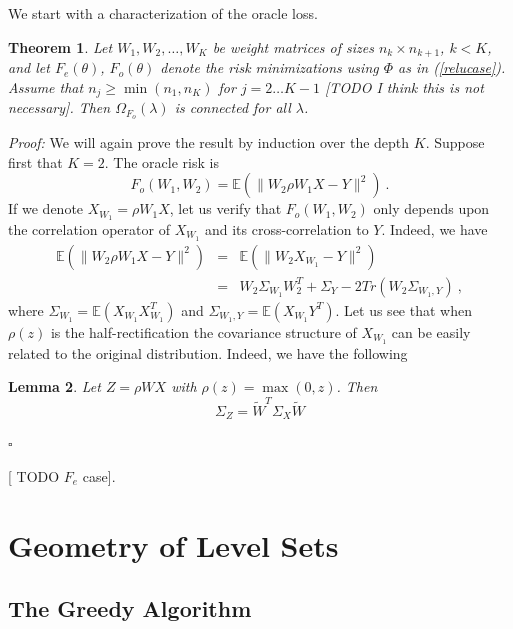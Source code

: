 \documentclass{article} %
\newcommand {\Fem} {F_{e}}
\newcommand {\Forr} {F_{o}}
\newcommand{\Exp}[1]{\mathbb{E}\left(#1 \right)}
\newtheorem{theorem}{Theorem}[section]
\newtheorem{lemma}[theorem]{Lemma}
\begin{document}
We start with a characterization of the oracle loss. 
\begin{theorem}
Let $W_1, W_2, \dots, W_K$ be weight matrices of sizes 
$n_k \times n_{k+1}$, $k < K$, and let $\Fem(\theta)$, $\Forr(\theta)$ 
denote the risk minimizations using $\Phi$ as in (\ref{relucase}).
Assume that $n_j \geq \min(n_1, n_K)$ for $j=2 \dots K-1$ [TODO I think this is not necessary].
Then $\Omega_{\Forr}(\lambda)$ is connected for all $\lambda$. 
\end{theorem}
{\it Proof:}
We will again prove the result by induction over the depth $K$. 
Suppose first that $K=2$. The oracle risk is 
$$\Forr( W_1, W_2) = \Exp{ \| W_2 \rho W_1 X - Y \|^2}~.$$
If we denote $X_{W_1} = \rho W_1 X$, let us verify that $\Forr(W_1, W_2)$ 
only depends upon the correlation operator of $X_{W_1}$ 
and its cross-correlation to $Y$. Indeed, we have
\begin{eqnarray*}
\Exp{ \| W_2 \rho W_1 X - Y \|^2} &=& \Exp{ \| W_2 X_{W_1} - Y \|^2} \\
&=& W_2 \Sigma_{W_1} W_2^T + \Sigma_Y - 2  Tr\left( W_2 \Sigma_{W_1,Y} \right)~,
\end{eqnarray*}
where $\Sigma_{W_1} = \Exp{ X_{W_1} X_{W_1}^T}$ and $\Sigma_{W_1,Y} = \Exp{ X_{W_1} Y^T}$.
Let us see that when $\rho(z)$ is the half-rectification the covariance structure 
of $X_{W_1}$ can be easily related to the original distribution. Indeed, we have
the following
\begin{lemma}
Let $Z = \rho W X$ with $\rho(z) = \max(0,z)$. Then
\begin{equation}
\Sigma_Z = \tilde{W}^T \Sigma_X \tilde{W} 
\end{equation}
\end{lemma}

$\square$



[ TODO  $\Fem$ case]. 





\section{Geometry of Level Sets}
\label{sec:QuanNoncon}

\subsection{The Greedy Algorithm}
\label{sec:GreedyAlg}
\end{document}
